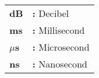 \hspace{-3mm}
\begin{tabular}{p{2cm}l}
    {\bf{dB}} & {\bf:} Decibel\\
    {\bf{ms}} & {\bf:} Millisecond\\
    {\bf{\(\mu\)s}} & {\bf:} Microsecond\\
    {\bf{ns}} & {\bf:} Nanosecond\\
\end{tabular}
